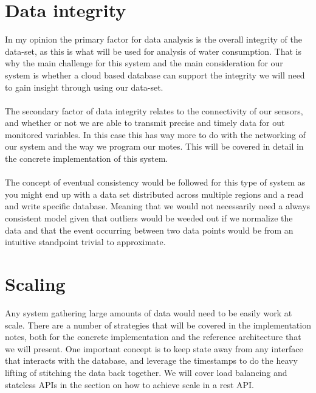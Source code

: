 \documentclass[]{uiophd}
\begin{document}
\section{Data integrity}
In my opinion the primary factor for data analysis is the overall integrity of the data-set, as this is what will be used for analysis of water consumption. That is why the main challenge for this system and the main consideration for our system is whether a cloud based database can support the integrity we will need to gain insight through using our data-set. 
\\\\
The secondary factor of data integrity relates to the connectivity of our sensors, and whether or not we are able to transmit precise and timely data for out monitored variables. In this case this has way more to do with the networking of our system and the way we program our motes. This will be covered in detail in the concrete implementation of this system.
\\\\
The concept of eventual consistency would be followed for this type of system as you might end up with a data set distributed across multiple regions and a read and write specific database. Meaning that we would not necessarily need a always consistent model given that outliers would be weeded out if we normalize the data and that the event occurring between two data points would be from an intuitive standpoint trivial to approximate.
\section{Scaling}
Any system gathering large amounts of data would need to be easily work at scale. There are a number of strategies that will be covered in the implementation notes, both for the concrete implementation and the reference architecture that we will present. One important concept is to keep state away from any interface that interacts with the database, and leverage the timestamps to do the heavy lifting of stitching the data back together. We will cover load balancing and stateless APIs in the section on how to achieve scale in a rest API.
\end{document}
